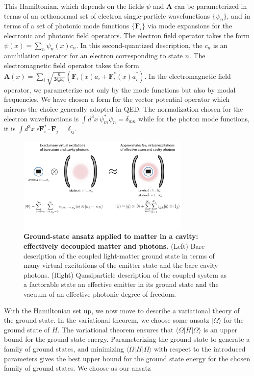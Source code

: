 \documentclass[aps,prl,twocolumn,
	groupedaddress,superscriptaddress,
	amsfonts,amssymb,amsmath,floatfix,
	citeautoscript]{revtex4-1}
\begin{document}
This Hamiltonian, which depends on the fields $\psi$ and $\mathbf{A}$ can be parameterized in terms of an orthonormal set of electron single-particle wavefunctions $\{\psi_n\}$, and in terms of a set of photonic mode functions $\{\mathbf{F}_i\}$ via mode expansions for the electronic and photonic field operators. The electron field operator takes the form $\psi(x) = \sum_n \psi_n(x)c_n$.
In this second-quantized description, the $c_n$ is an annihilation operator for an electron corresponding to state $n$. The electromagnetic field operator takes the form $\mathbf{A}(x) = \sum_i\sqrt{\frac{\hbar}{2\epsilon_0\omega_i}} \left(\mathbf{F}_i(x)a_i+\mathbf{F}^*_i(x)a^{\dagger}_i\right)$. In the electromagnetic field operator, we parameterize not only by the mode functions but also by modal frequencies. We have chosen a form for the vector potential operator which mirrors the choice generally adopted in QED. The normalization chosen for the electron wavefunctions is $\int d^3x~ \psi_m^*\psi_n = \delta_{mn}$ while for the photon mode functions, it is $\int d^3x~\epsilon\mathbf{F}_i^*\cdot\mathbf{F}_j = \delta_{ij}.$
\begin{figure}[t]
\includegraphics[width=8.5cm]{conceptfigure.pdf}
\caption{\textbf{Ground-state ansatz applied to matter in a cavity: effectively decoupled matter and photons.} (Left) Bare description of the coupled light-matter ground state in terms of many virtual excitations of the emitter state and the bare cavity photons. (Right) Quasiparticle description of the coupled system as a factorable state an effective emitter in its ground state and the vacuum of an effective photonic degree of freedom.}
\label{fig:ansatz}
\end{figure}
With the Hamiltonian set up, we now move to describe a variational theory of the ground state. In the variational theorem, we choose some ansatz $|\Omega\rangle$ for the ground state of $H$. The variational theorem ensures that $\langle \Omega|H|\Omega\rangle$ is an upper bound for the ground state energy. Parameterizing the ground state to generate a family of ground states, and minimizing $\langle \Omega|H|\Omega\rangle$ with respect to the introduced parameters gives the best upper bound for the ground state energy for the chosen family of ground states.  We choose as our ansatz
\end{document}
